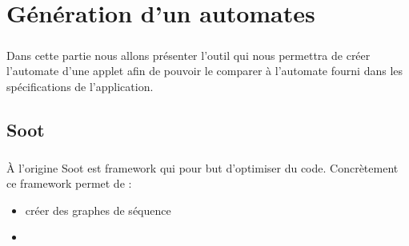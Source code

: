 \chapter{Génération d'un automates}

\paragraph{}
Dans cette partie nous allons présenter l'outil qui nous permettra de créer l'automate d'une applet afin de pouvoir le comparer à l'automate fourni dans les spécifications de l'application.

\section{Soot}

\paragraph{}
À l'origine Soot est framework qui pour but d'optimiser du code. Concrètement ce framework permet de :

\begin{itemize}
	\item créer des graphes de séquence
	\item 
\end{itemize}

\section{}

\paragraph{}
